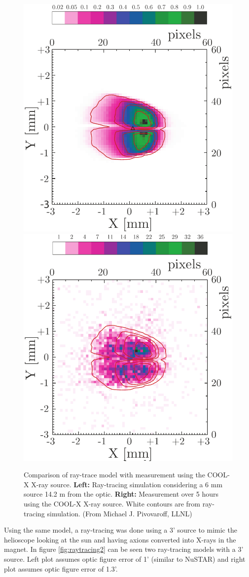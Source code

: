 \begin{figure}[htbp]
  \centering
    \includegraphics[width=0.47\linewidth]{figures/cast/coolX-simulation.pdf}
    \includegraphics[width=0.47\linewidth]{figures/cast/coolX-SRMM.pdf}
  \caption{\footnotesize Comparison of ray-trace model with measurement using the COOL-X X-ray source.  \textbf{Left:} Ray-tracing simulation considering a 6 mm source 14.2 m from the optic.  \textbf{Right:} Measurement over 5 hours using the COOL-X X-ray source. White contours are from ray-tracing simulation. (From Michael J. Pivovaroff, LLNL) }
  \label{fig:raytracing1}
\end{figure}

Using the same model, a ray-tracing was done using a 3' source to mimic the helioscope looking at the sun and having axions converted into X-rays in the magnet. In figure \ref{fig:raytracing2} can be seen two ray-tracing models with a 3' source. Left plot assumes optic figure error of 1' (similar to NuSTAR) and right plot assumes optic figure error of 1.3'.

